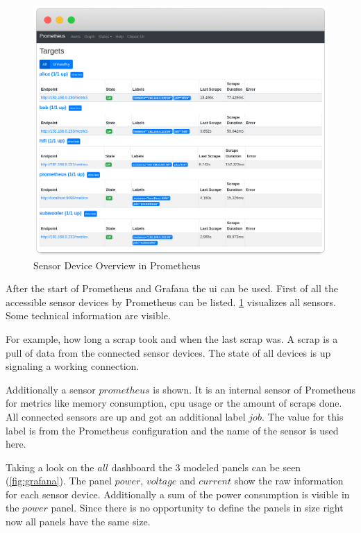 \begin{figure}[!ht]
	\includegraphics[width=\linewidth]{assets/images/prometheus}
	\caption{Sensor Device Overview in Prometheus}
	\label{fig:prometheus}
\end{figure}

After the start of Prometheus and Grafana the \gls{ui} can be used. First of all the accessible sensor devices by Prometheus can be listed. \cref{fig:prometheus} visualizes all sensors. Some technical information are visible. 

For example, how long a scrap took and when the last scrap was. A scrap is a pull of data from the connected sensor devices. The state of all devices is up signaling a working connection. 

Additionally a sensor $prometheus$ is shown. It is an internal sensor of Prometheus for metrics like memory consumption, \gls{cpu} usage or the amount of scraps done. All connected sensors are up and got an additional label $job$. The value for this label is from the Prometheus configuration and the name of the sensor is used here.


Taking a look on the $all$ dashboard the 3 modeled panels can be seen (\cref{fig:grafana}). The panel $power$, $voltage$ and $current$ show the raw information for each sensor device. Additionally a sum of the power consumption is visible in the $power$ panel. Since there is no opportunity to define the panels in size right now all panels have the same size. 

